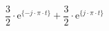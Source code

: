 \correct
\[
 \frac{3}{2}\cdot\textrm{e}^{\{-j \cdot \pi \cdot t \}}
+\frac{3}{2}\cdot\textrm{e}^{\{ j \cdot \pi \cdot t \}}
\]
